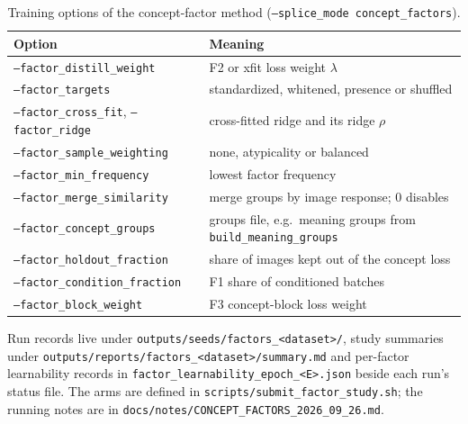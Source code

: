 \documentclass{article}
\begin{document}
\begin{table}[h]
\centering
\caption{Training options of the concept-factor method (\texttt{--splice\_mode concept\_factors}).}
\small
\begin{tabularx}{\linewidth}{l X}
\toprule
Option & Meaning \\
\midrule
\texttt{--factor\_distill\_weight} & F2 or xfit loss weight $\lambda$ \\
\texttt{--factor\_targets} & standardized, whitened, presence or shuffled \\
\texttt{--factor\_cross\_fit}, \texttt{--factor\_ridge} & cross-fitted ridge and its ridge $\rho$ \\
\texttt{--factor\_sample\_weighting} & none, atypicality or balanced \\
\texttt{--factor\_min\_frequency} & lowest factor frequency \\
\texttt{--factor\_merge\_similarity} & merge groups by image response; 0 disables \\
\texttt{--factor\_concept\_groups} & groups file, e.g.\ meaning groups from \texttt{build\_meaning\_groups} \\
\texttt{--factor\_holdout\_fraction} & share of images kept out of the concept loss \\
\texttt{--factor\_condition\_fraction} & F1 share of conditioned batches \\
\texttt{--factor\_block\_weight} & F3 concept-block loss weight \\
\bottomrule
\end{tabularx}
\end{table}

Run records live under \texttt{outputs/seeds/factors\_<dataset>/}, study summaries under
\texttt{outputs/reports/factors\_<dataset>/summary.md} and per-factor learnability records in
\texttt{factor\_learnability\_epoch\_<E>.json} beside each run's status file. The arms are defined in
\texttt{scripts/submit\_factor\_study.sh}; the running notes are in
\texttt{docs/notes/CONCEPT\_FACTORS\_2026\_09\_26.md}.
\end{document}
